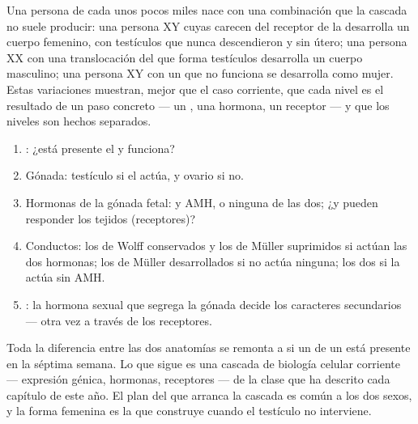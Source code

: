 \begin{example}\label{ex:g11:becoming-male-female:disagree}
Una persona de cada unos pocos miles nace con una combinación que la
cascada no suele producir: una persona XY cuyas  carecen del
receptor de la  desarrolla un cuerpo femenino, con
testículos que nunca descendieron y sin útero; una persona XX con una
translocación del  que forma testículos desarrolla un cuerpo
masculino; una persona XY con un  que no funciona se desarrolla como
mujer. Estas variaciones muestran, mejor que el caso corriente, que
cada nivel es el resultado de un paso concreto --- un , una hormona,
un receptor --- y que los niveles son hechos separados.
\end{example}

\begin{method}\label{met:g11:becoming-male-female:case}
\begin{enumerate}
  \item {}: ¿está presente el  y funciona?
  \item Gónada: testículo si el  actúa, y ovario si no.
  \item Hormonas de la gónada fetal:  y AMH, o ninguna de
        las dos; ¿y pueden responder los tejidos (receptores)?
  \item Conductos: los de Wolff conservados y los de Müller suprimidos
        si actúan las dos hormonas; los de Müller desarrollados si no
        actúa ninguna; los dos si la  actúa sin AMH.
  \item {}: la hormona sexual que segrega la gónada decide los
        caracteres secundarios --- otra vez a través de los receptores.
\end{enumerate}
\end{method}

\begin{remark}\label{rem:g11:becoming-male-female:onegene}
Toda la diferencia entre las dos anatomías se remonta a si un  de un
 está presente en la séptima semana. Lo que sigue es una
cascada de biología celular corriente --- expresión génica, hormonas,
receptores --- de la clase que ha descrito cada capítulo de este año.
El plan del que arranca la cascada es común a los dos sexos, y la forma
femenina es la que construye cuando el testículo no interviene.
\end{remark}

